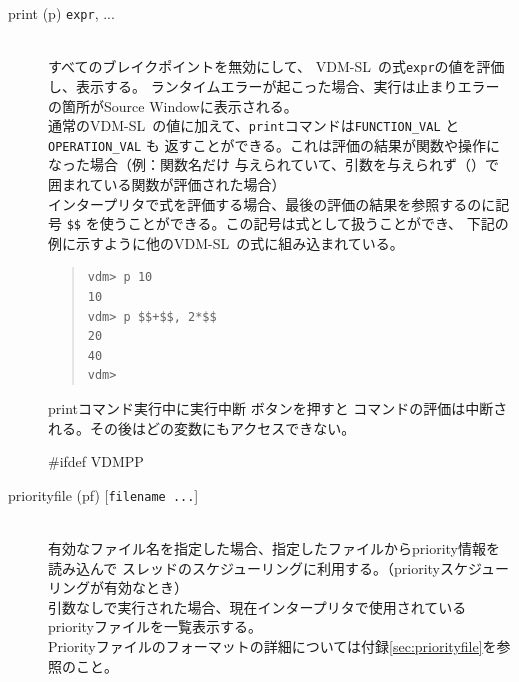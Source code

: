 \documentclass[\pformat,12pt]{article}
\newcommand{\vdmslpp}{VDM-SL}
\newcommand{\vdmslpp}{VDM++}
\newcommand{\guicmd}[1]{{\sf #1}}
\newcommand{\guicmd}[1]{{\gt #1}}
\begin{document}
\begin{description}

\item[print (p) {\tt expr}, ...] \mbox{}\\
  すべてのブレイクポイントを無効にして、 \vdmslpp\ の式{\tt expr}の値を評価し、表示する。
  ランタイムエラーが起こった場合、実行は止まりエラーの箇所が\guicmd{Source Window}に表示される。\\
  
  通常の\vdmslpp\ の値に加えて、{\tt print}コマンドは{\tt FUNCTION\_VAL}  と{\tt OPERATION\_VAL} も
  返すことができる。これは評価の結果が関数や操作になった場合（例：関数名だけ
  与えられていて、引数を与えられず（）で囲まれている関数が評価された場合）\\
  
  インタープリタで式を評価する場合、最後の評価の結果を参照するのに記号
   {\tt \$\$}\index{\$\$} を使うことができる。この記号は式として扱うことができ、
  下記の例に示すように他の\vdmslpp\ の式に組み込まれている。

\begin{quote}
\begin{verbatim}
vdm> p 10
10
vdm> p $$+$$, 2*$$
20
40
vdm> 
\end{verbatim}
\end{quote}

  printコマンド実行中に\guicmd{実行中断} ボタンを押すと
  コマンドの評価は中断される。その後はどの変数にもアクセスできない。
  
#ifdef VDMPP
\item[priorityfile (pf) \mbox{[{\tt filename ...}]}]
  \mbox{}\\
  有効なファイル名を指定した場合、指定したファイルからpriority情報を読み込んで
  スレッドのスケジューリングに利用する。（priorityスケジューリングが有効なとき）\\

  引数なしで実行された場合、現在インタープリタで使用されているpriorityファイルを一覧表示する。\\

  Priorityファイルのフォーマットの詳細については付録\ref{sec:priorityfile}を参照のこと。


\end{description}
\end{document}

